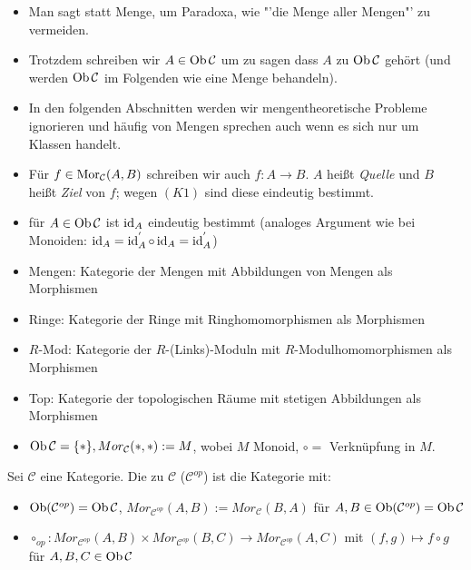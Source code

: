 \begin{anm}
	\begin{itemize}
		\item Man sagt  statt Menge, um Paradoxa, wie "'die Menge aller Mengen"' zu vermeiden.
		\item Trotzdem schreiben wir $A \in \text{Ob}\,\mathcal{C}$ um zu sagen dass $A$ zu $\text{Ob}\,\mathcal{C}$ gehört (und werden $\text{Ob}\,\mathcal{C}$ im Folgenden wie eine Menge behandeln).
		\item In den folgenden Abschnitten werden wir mengentheoretische Probleme ignorieren und häufig von Mengen sprechen auch wenn es sich nur um Klassen handelt.
		\item Für $f \in \text{Mor}_{\mathcal{C}}(A,B)$ schreiben wir auch $f: A \to B $. $A$ heißt \emph{Quelle} und $B$ heißt \emph{Ziel} von $f$; wegen $(K1)$ sind diese eindeutig bestimmt.
		\item für $A \in \text{Ob}\,\mathcal{C}$ ist $\operatorname{id}_A$ eindeutig bestimmt (analoges Argument wie bei Monoiden: $\operatorname{id}_A = \operatorname{id}_A^{'} \circ \operatorname{id}_A = \operatorname{id}_A^{'}$)
	\end{itemize}
\end{anm}
\begin{bsp}
	\begin{itemize}
		\item Mengen: Kategorie der Mengen mit Abbildungen von Mengen als Morphismen
		\item Ringe: Kategorie der Ringe mit Ringhomomorphismen als Morphismen
		\item $R$-Mod: Kategorie der $R$-(Links)-Moduln mit $R$-Modulhomomorphismen als Morphismen
		\item Top: Kategorie der topologischen Räume mit stetigen Abbildungen als Morphismen
		\item $\text{Ob}\,\mathcal{C}=\{\ast\}, Mor_{\mathcal{C}}(\ast,\ast) := M $, wobei $M$ Monoid, $\circ = $ Verknüpfung in $M$.
	\end{itemize}
\end{bsp}
\begin{df}\label{4.3}
	Sei $\mathcal{C}$  eine Kategorie. Die zu $\mathcal{C}$   ($\mathcal{C}^{op}$) ist die Kategorie mit: 
	\begin{itemize}
		\item $\text{Ob}(\mathcal{C}^{op}) = \text{Ob}\,\mathcal{C}$, $Mor_{\mathcal{C}^{op}}(A,B) := Mor_{\mathcal{C}}(B,A)$ für $A,B \in \text{Ob}(\mathcal{C}^{op}) = \text{Ob}\,\mathcal{C}$
		\item $\circ_{op}: Mor_{\mathcal{C}^{op}}(A,B) \times Mor_{\mathcal{C}^{op}}(B,C) \to Mor_{\mathcal{C}^{op}}(A,C) $ mit $(f,g) \mapsto f \circ g $ für $A,B,C \in \text{Ob}\,\mathcal{C}$
	\end{itemize}
\end{df}
